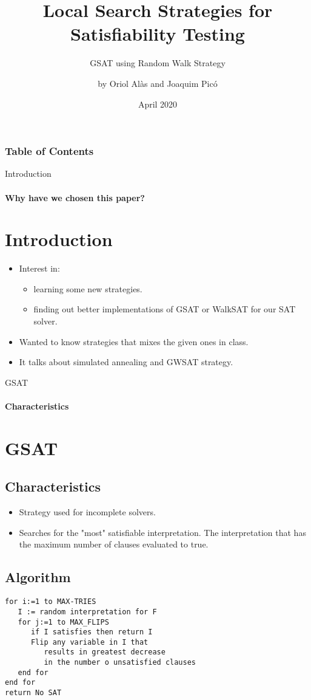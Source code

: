 \documentclass{beamer}
\title{Local Search Strategies for Satisfiability Testing}
\subtitle{GSAT using Random Walk Strategy}
\author{by Oriol Alàs and Joaquim Picó}
\date{April 2020}
\begin{document}
\maketitle
\begin{frame}
\frametitle{Table of Contents}
\tableofcontents
\end{frame}

\begin{frame}{Introduction}
\framesubtitle{Why have we chosen this paper?}
\section{Introduction}
\begin{itemize}
	\item Interest in:
	\begin{itemize}
		\item  learning some new strategies.
		\item finding out better implementations of GSAT or WalkSAT for our SAT solver.
	\end{itemize}
	\item Wanted to know strategies that mixes the given ones in class.
	\item It talks about simulated annealing and GWSAT strategy.
\end{itemize}
\end{frame}
\begin{frame}{GSAT}
\framesubtitle{Characteristics}
\section{GSAT}
\subsection{Characteristics}
\begin{itemize}
	\item Strategy used for incomplete solvers.
    \item Searches for the "most" satisfiable interpretation. The interpretation that has the maximum number of clauses evaluated to true.
\end{itemize}
\end{frame}
\begin{frame}[fragile]
\subsection{Algorithm}
\begin{verbatim}
for i:=1 to MAX-TRIES
   I := random interpretation for F
   for j:=1 to MAX_FLIPS
      if I satisfies then return I
      Flip any variable in I that
         results in greatest decrease
         in the number o unsatisfied clauses
   end for
end for
return No SAT
\end{verbatim}
\end{frame}
\end{document}
